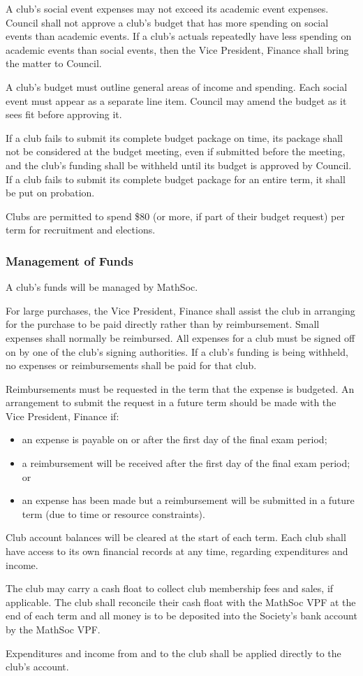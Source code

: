 A club's social event expenses may not exceed its academic event expenses.
Council shall not approve a club's budget that has more spending on social
events than academic events. If a club's actuals repeatedly have less spending
on academic events than social events, then the Vice President, Finance shall
bring the matter to Council.


A club's budget must outline general areas of income and spending. Each social
event must appear as a separate line item. Council may amend the budget as it
sees fit before approving it.

If a club fails to submit its complete budget package on time, its package shall
not be considered at the budget meeting, even if submitted before the meeting,
and the club's funding shall be withheld until its budget is approved by
Council. If a club fails to submit its complete budget package for an entire
term, it shall be put on probation.

Clubs are permitted to spend \$80 (or more, if part of their budget request) per
term for recruitment and elections.

\subsubsection{Management of Funds}
A club's funds will be managed by MathSoc.

For large purchases, the Vice President, Finance shall assist the club in
arranging for the purchase to be paid directly rather than by reimbursement.
Small expenses shall normally be reimbursed. All expenses for a club must be
signed off on by one of the club's signing authorities. If a club's funding is
being withheld, no expenses or reimbursements shall be paid for that club.

Reimbursements must be requested in the term that the expense is budgeted. 
An arrangement to submit the request in a future term should be made with
the Vice President, Finance if:
\begin{itemize}
	\item an expense is payable on or after the first day of the final exam period;
	\item a reimbursement will be received after the first day of the final exam period; or
	\item an expense has been made but a reimbursement will be submitted in a 
	future term (due to time or resource constraints).
\end{itemize}

Club account balances will be cleared at the start of each term. Each club shall have access to its own financial records at any time, regarding expenditures and income. 

The club may carry a cash float to collect club membership fees and sales, if applicable. 
The club shall reconcile their cash float with the MathSoc VPF at the end of each term and all money is to be deposited into the Society's bank account by the MathSoc VPF. 

Expenditures and income from and to the club shall be applied directly to the club's account. 
